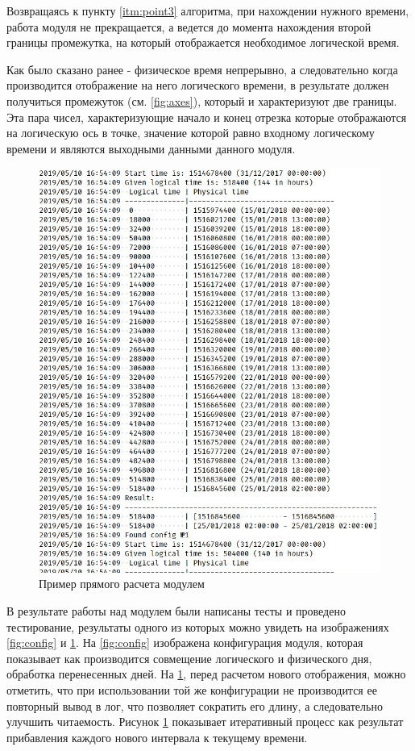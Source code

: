 \indent Возвращаясь к пункту \ref{itm:point3} алгоритма, при нахождении нужного времени, работа модуля не прекращается, а ведется до момента нахождения второй границы промежутка, на который отображается необходимое логической время.

\indent Как было сказано ранее - физическое время непрерывно, а следовательно когда производится отображение на него логического времени, в результате должен получиться промежуток (см. \ref{fig:axes}), который и характеризуют две границы.
Эта пара чисел, характеризующие начало и конец отрезка которые отображаются на логическую ось в точке, значение которой равно входному логическому времени и являются выходными данными данного модуля.

\begin{figure}[ht]
	\includegraphics[scale=0.6]{pics/scheduleEvalExample.png}
	\caption{Пример прямого расчета модулем}
	\label{fig:eval1}
	\centering
\end{figure}

\indent В результате работы над модулем были написаны тесты и проведено тестирование, результаты одного из которых можно увидеть на изображениях \ref{fig:config} и \ref{fig:eval1}.
На \ref{fig:config} изображена конфигурация модуля, которая показывает как производится совмещение логического и физического дня, обработка перенесенных дней.
На \ref{fig:eval1}, перед расчетом нового отображения, можно отметить, что при использовании той же конфигурации не производится ее повторный вывод в лог, что позволяет сократить его длину, а следовательно улучшить читаемость.
Рисунок \ref{fig:eval1} показывает итеративный процесс как результат прибавления каждого нового интервала к текущему времени.


